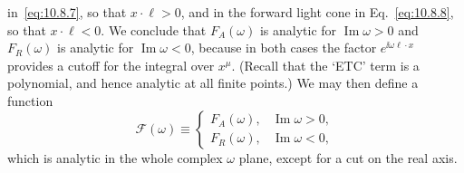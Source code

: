 in~\eqref{eq:10.8.7}, so that $x\cdot\ell>0$, and in the forward light cone
in Eq.~\eqref{eq:10.8.8}, so that $x\cdot\ell<0$. We conclude that
$F_A(\omega)$ is analytic for $\operatorname{Im}\omega>0$ and $F_R(\omega)$
is analytic for $\operatorname{Im}\omega<0$, because in both cases the factor
$e^{\ii\omega\ell\cdot x}$ provides a cutoff for the integral over $x^\mu$.
(Recall that the `ETC' term is a polynomial, and hence analytic at all finite
points.) We may then define a function
\begin{equation}
  \mathcal F(\omega)\equiv
  \begin{cases}
    F_A(\omega),&\operatorname{Im}\omega>0,\\
    F_R(\omega),&\operatorname{Im}\omega<0,
  \end{cases}
  \tag{10.8.11}\label{eq:10.8.11}
\end{equation}
which is analytic in the whole complex $\omega$ plane, except for a cut on
the real axis.

